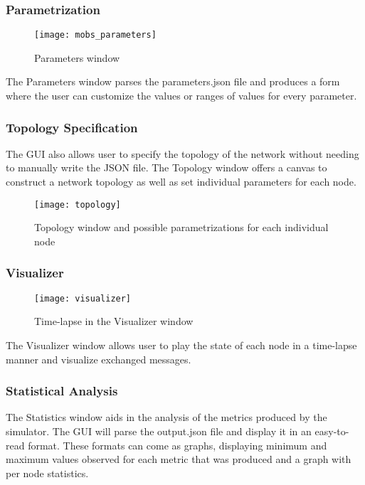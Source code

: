 \subsubsection{Parametrization}\label{subsubsec:parametrization}

\begin{figure}[h]
	\centering
	\texttt{[image: mobs\_parameters]}
	\caption{Parameters window}
	\label{fig:mobs_parameters}
\end{figure}

The Parameters window parses the parameters.json file and produces a form
where the user can customize the values or ranges of values for every parameter.

\subsubsection{Topology Specification}\label{subsubsec:topology_specification}

The GUI also allows user to specify the topology of the network without needing
to manually write the JSON file. The Topology window offers a canvas to construct a network
topology as well as set individual parameters for each node.

\begin{figure}[h]
	\centering
	\texttt{[image: topology]}
	\caption{Topology window and possible parametrizations for each individual node}
	\label{fig:topology}
\end{figure}

\subsubsection{Visualizer}\label{subsubsec:visualizer}

\begin{figure}[h]
	\centering
	\texttt{[image: visualizer]}
	\caption{Time-lapse in the Visualizer window}
	\label{fig:visualizer}
\end{figure}

The Visualizer window allows user to play the state of each node in a time-lapse manner
and visualize exchanged messages.

\subsubsection{Statistical Analysis}\label{subsubsec:statistical_analysis}

The Statistics window aids in the analysis of the metrics produced by the simulator.
The GUI will parse the output.json file and display it in an easy-to-read format.
These formats can come as graphs, displaying minimum and maximum values observed
for each metric that was produced and a graph with per node statistics.

